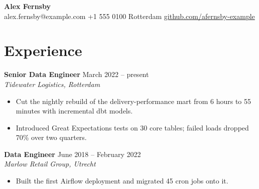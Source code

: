 \documentclass[10pt,a4paper]{article}
\newcommand{\entry}[3]{\textbf{#1} \hfill #3\\ \emph{#2}\vspace{-2pt}}
\begin{document}
{\LARGE\textbf{Alex Fernsby}}\\
alex.fernsby@example.com \quad +1 555 0100 \quad Rotterdam \quad \href{https://github.com/afernsby-example}{github.com/afernsby-example}

\section*{Experience}
\entry{Senior Data Engineer}{Tidewater Logistics, Rotterdam}{March 2022 -- present}
\begin{itemize}\setlength\itemsep{0pt}
  \item Cut the nightly rebuild of the delivery-performance mart from 6 hours to 55 minutes with incremental dbt models.
  \item Introduced Great Expectations tests on 30 core tables; failed loads dropped 70\% over two quarters.
\end{itemize}
\entry{Data Engineer}{Marlow Retail Group, Utrecht}{June 2018 -- February 2022}
\begin{itemize}
  \item Built the first Airflow deployment and migrated 45 cron jobs onto it.
\end{itemize}
\end{document}
